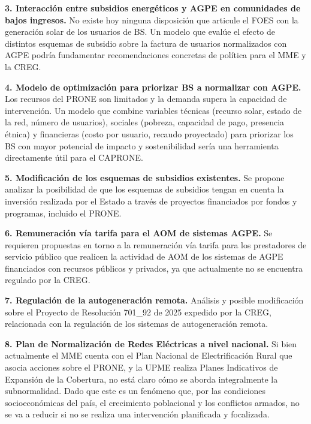 \textbf{3. Interacción entre subsidios energéticos y AGPE en comunidades
de bajos ingresos.} No existe hoy ninguna disposición que articule el
FOES con la generación solar de los usuarios de BS. Un modelo que
evalúe el efecto de distintos esquemas de subsidio sobre la factura de
usuarios normalizados con AGPE podría fundamentar recomendaciones
concretas de política para el MME y la CREG.

\textbf{4. Modelo de optimización para priorizar BS a normalizar con
AGPE.} Los recursos del PRONE son limitados y la demanda supera la
capacidad de intervención. Un modelo que combine variables técnicas
(recurso solar, estado de la red, número de usuarios), sociales
(pobreza, capacidad de pago, presencia étnica) y financieras (costo
por usuario, recaudo proyectado) para priorizar los BS con mayor
potencial de impacto y sostenibilidad sería una herramienta directamente
útil para el CAPRONE.

\textbf{5. Modificación de los esquemas de subsidios existentes.} Se
propone analizar la posibilidad de que los esquemas de subsidios
tengan en cuenta la inversión realizada por el Estado a través de
proyectos financiados por fondos y programas, incluido el PRONE.

\textbf{6. Remuneración vía tarifa para el AOM de sistemas AGPE.}
Se requieren propuestas en torno a la remuneración vía tarifa para los
prestadores de servicio público que realicen la actividad de AOM de los
sistemas de AGPE financiados con recursos públicos y privados, ya que
actualmente no se encuentra regulado por la CREG.

\textbf{7. Regulación de la autogeneración remota.} Análisis y posible
modificación sobre el Proyecto de Resolución 701\_92 de 2025 expedido
por la CREG, relacionada con la regulación de los sistemas de
autogeneración remota.

\textbf{8. Plan de Normalización de Redes Eléctricas a nivel nacional.}
Si bien actualmente el MME cuenta con el Plan Nacional de
Electrificación Rural que asocia acciones sobre el PRONE, y la UPME
realiza Planes Indicativos de Expansión de la Cobertura, no está claro
cómo se aborda integralmente la subnormalidad. Dado que este es un
fenómeno que, por las condiciones socioeconómicas del país, el
crecimiento poblacional y los conflictos armados, no se va a reducir si
no se realiza una intervención planificada y focalizada.
